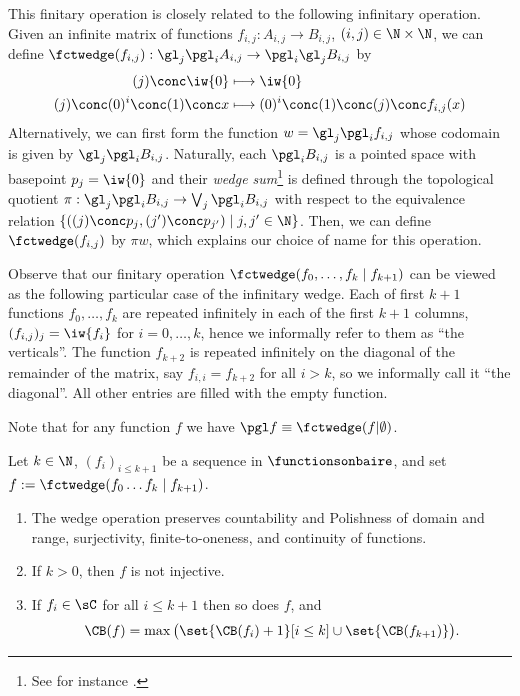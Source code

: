 \begin{remark}\label{rem:infinitewedge}
This finitary operation is closely related to the following infinitary operation.%
Given an infinite matrix of functions $f_{i,j}:A_{i,j}\to B_{i,j}$, ${(i,j)\in\N\times \N}$, we can define $\fctwedge(f_{i,j}):\gl_j \pgl_i A_{i,j} \to \pgl_i \gl_j B_{i,j}$ by
\begin{align*}
(j)\conc \iw{0}&\longmapsto\iw{0}\\
 (j)\conc(0)^i\conc(1)\conc x&\longmapsto(0)^i\conc(1)\conc(j)\conc f_{i,j}(x)
\end{align*}
Alternatively, we can first form the function $w=\gl_j \pgl_{i} f_{i,j}$ whose codomain is given by $\gl_j \pgl_{i} B_{i,j}$.
Naturally, each $\pgl_i B_{i,j}$ is a pointed space with basepoint $p_j=\iw{0}$ and their \emph{wedge sum}\footnote{See for instance \cite[p.153]{MR0957919}.} is defined through
the topological quotient $\pi:\gl_j  \pgl_i B_{i,j} \to \bigvee_j \pgl_i B_{i,j}$ with respect to the equivalence relation $\{((j)\conc p_j,(j')\conc p_{j'})\mid j,j'\in \N\}$.
Then, we can define $\fctwedge(f_{i,j})$ by $\pi w$, which explains our choice of name for this operation.


Observe that our finitary operation $\fctwedge (f_0,\ldots,f_{k}\mid f_{k+1})$ can be viewed as the following particular case of the infinitary wedge. Each of first $k+1$ functions $f_0,\ldots, f_k$ are repeated infinitely in each of the first $k+1$ columns, $(f_{i,j})_j=\iw{f_i}$ for $i=0,\ldots, k$, hence we informally refer to them as ``the verticals''.
The function $f_{k+2}$ is repeated infinitely on the diagonal of the remainder of the matrix, say $f_{i,i}=f_{k+2}$ for all $i>k$, so we informally call it ``the diagonal''. All other entries are filled with the empty function.
\end{remark}

Note that for any function $f$ we have $\pgl f \equiv \fctwedge (f| \emptyset)$.

\begin{fact}\label{BasicfactsWedge}
Let $k\in\N$, $(f_i)_{i\leq k+1}$ be a sequence in $\functionsonbaire$, and set $f:=\fctwedge(f_0\ldots f_k\mid f_{k+1})$.
\begin{enumerate}
\item The wedge operation preserves countability and Polishness of domain and range, surjectivity, finite-to-oneness, and continuity of functions.
\item If $k>0$, then $f$ is not injective.
\item If $f_i\in\sC$ for all $i\leq k+1$ then so does $f$, and 
\[\CB(f)=\max\big(\set{\CB(f_i)+1}[i\leq k]\cup\set{\CB(f_{k+1})}\big).\]
\end{enumerate}
\end{fact}

